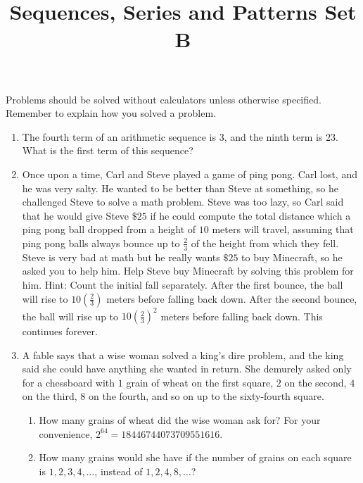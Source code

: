 \documentclass{article}
\title{Sequences, Series and Patterns Set B}
\date{}
\author{}
\begin{document}
    \maketitle
    \noindent Problems should be solved without calculators unless otherwise
    specified. Remember to explain how you solved a problem.
    \begin{enumerate}
        \item The fourth term of an arithmetic sequence is $3$, and the ninth
        term is $23$. What is the first term of this sequence?
        \vspace{3cm}
        \item Once upon a time, Carl and Steve played a game of ping pong. Carl
        lost, and he was very salty. He wanted to be better than Steve at
        something, so he challenged Steve to solve a math problem. Steve was too
        lazy, so Carl said that he would give Steve $\$25$ if he could compute
        the total distance which a ping pong ball dropped from a height of $10$
        meters will travel, assuming that ping pong balls always bounce up to
        $\frac{2}{3}$ of the height from which they fell. Steve is very bad at
        math but he really wants $\$25$ to buy Minecraft, so he asked you to
        help him. Help Steve buy Minecraft by solving this problem for him.
        Hint: Count the initial fall separately. After the first bounce, the
        ball will rise to $10\left(\frac{2}{3}\right)$ meters before falling back
        down. After the second bounce, the ball will rise up to
        $10\left(\frac{2}{3}\right)^2$ meters before falling back down. This
        continues forever.
        \vspace{3cm}
        \item A fable says that a wise woman solved a king's dire problem, and
        the king said she could have anything she wanted in return. She demurely
        asked only for a chessboard with $1$ grain of wheat on the first square,
        $2$ on the second, $4$ on the third, $8$ on the fourth, and so on up to
        the sixty-fourth square.
        \begin{enumerate}
            \item How many grains of wheat did the wise woman ask for? For your
            convenience, $2^{64} = 18446744073709551616$.
            \vspace{3cm}
            \item How many grains would she have if the number of grains on each
            square is $1, 2, 3, 4, \dots$, instead of $1, 2, 4, 8, \dots$?

\end{enumerate}
\end{enumerate}
\end{document}

